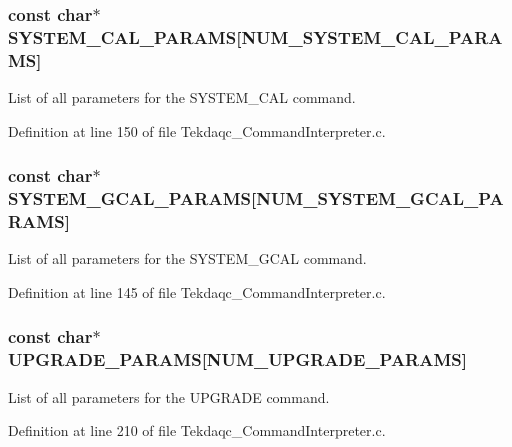 \hypertarget{group__command__interpreter_ga012ad2ab047f56ee2f1bbe24441f46d3}{
\subsubsection[{S\-Y\-S\-T\-E\-M\-\_\-\-C\-A\-L\-\_\-\-P\-A\-R\-A\-M\-S}]{\setlength{\rightskip}{0pt plus 5cm}const char$\ast$ S\-Y\-S\-T\-E\-M\-\_\-\-C\-A\-L\-\_\-\-P\-A\-R\-A\-M\-S\mbox{[}{\bf N\-U\-M\-\_\-\-S\-Y\-S\-T\-E\-M\-\_\-\-C\-A\-L\-\_\-\-P\-A\-R\-A\-M\-S}\mbox{]}}}\label{group__command__interpreter_ga012ad2ab047f56ee2f1bbe24441f46d3}
List of all parameters for the S\-Y\-S\-T\-E\-M\-\_\-\-C\-A\-L command. 

Definition at line 150 of file Tekdaqc\-\_\-\-Command\-Interpreter.\-c.

\hypertarget{group__command__interpreter_ga12cbb3a7ff1264641a75db037130c062}{
\subsubsection[{S\-Y\-S\-T\-E\-M\-\_\-\-G\-C\-A\-L\-\_\-\-P\-A\-R\-A\-M\-S}]{\setlength{\rightskip}{0pt plus 5cm}const char$\ast$ S\-Y\-S\-T\-E\-M\-\_\-\-G\-C\-A\-L\-\_\-\-P\-A\-R\-A\-M\-S\mbox{[}{\bf N\-U\-M\-\_\-\-S\-Y\-S\-T\-E\-M\-\_\-\-G\-C\-A\-L\-\_\-\-P\-A\-R\-A\-M\-S}\mbox{]}}}\label{group__command__interpreter_ga12cbb3a7ff1264641a75db037130c062}
List of all parameters for the S\-Y\-S\-T\-E\-M\-\_\-\-G\-C\-A\-L command. 

Definition at line 145 of file Tekdaqc\-\_\-\-Command\-Interpreter.\-c.

\hypertarget{group__command__interpreter_gaf4f7b3cf35167e36d202bb65a02f0b71}{
\subsubsection[{U\-P\-G\-R\-A\-D\-E\-\_\-\-P\-A\-R\-A\-M\-S}]{\setlength{\rightskip}{0pt plus 5cm}const char$\ast$ U\-P\-G\-R\-A\-D\-E\-\_\-\-P\-A\-R\-A\-M\-S\mbox{[}{\bf N\-U\-M\-\_\-\-U\-P\-G\-R\-A\-D\-E\-\_\-\-P\-A\-R\-A\-M\-S}\mbox{]}}}\label{group__command__interpreter_gaf4f7b3cf35167e36d202bb65a02f0b71}
List of all parameters for the U\-P\-G\-R\-A\-D\-E command. 

Definition at line 210 of file Tekdaqc\-\_\-\-Command\-Interpreter.\-c.

